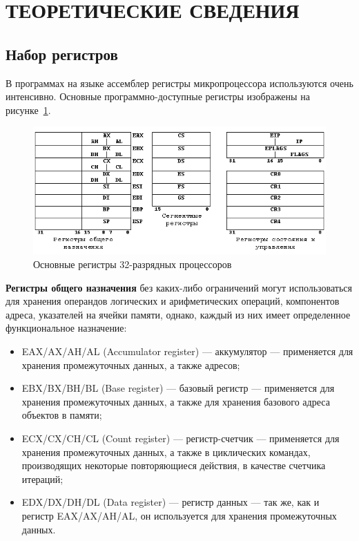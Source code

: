 \section{ТЕОРЕТИЧЕСКИЕ СВЕДЕНИЯ}

\subsection{Набор регистров}

В программах на языке ассемблер регистры микропроцессора используются очень интенсивно.
Основные программно-доступные регистры изображены на рисунке~\ref{fig:registers}.

\begin{figure}[htbp]
  \centering
  \includegraphics[width=150mm]{pic/registers}
  \caption{Основные регистры 32-разрядных процессоров}\label{fig:registers}
\end{figure}

\textbf{Регистры общего назначения} без каких-либо ограничений могут использоваться
для хранения операндов логических и арифметических операций, компонентов адреса, указателей
на ячейки памяти, однако, каждый из них имеет определенное функциональное назначение:

\begin{itemize}
  \item EAX/AX/AH/AL (Accumulator register) --- аккумулятор --- применяется для хранения
    промежуточных данных, а также адресов;
  \item EBX/BX/BH/BL (Base register) --- базовый регистр --- применяется для хранения
    промежуточных данных, а также для хранения базового адреса объектов в памяти;
  \item ECX/CX/CH/CL (Count register) --- регистр-счетчик --- применяется для хранения
    промежуточных данных, а также в циклических командах, производящих некоторые
    повторяющиеся действия, в качестве счетчика итераций;
  \item EDX/DX/DH/DL (Data register) --- регистр данных --- так же, как и регистр EAX/AX/AH/AL, он
    используется для хранения промежуточных данных.
\end{itemize}

